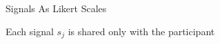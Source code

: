 \documentclass[
  ignorenonframetext,
]{beamer}
\begin{document}
\begin{frame}{Signals As Likert Scales}
\begin{figure}
\begin{minipage}[t]{0.14\linewidth}
{\centering 


}

\end{minipage}%

\end{figure}

Each signal \(s_j\) is shared only with the participant
\end{frame}
\end{document}
